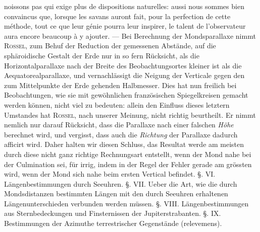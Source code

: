 \noindent noissons pas qui exige plus de dispositions naturelles: aussi nous sommes bien convaincus que, lorsque les savans auront fait, pour la perfection de cette méthode, tout ce que leur génie pourra leur inspirer, le talent de l'observateur aura encore beaucoup à y ajouter. — Bei Berechnung der Mondsparallaxe nimmt \textsc{Rossel}, zum Behuf der Reduction der gemessenen Abstände, auf die sphäroidische Gestalt der Erde nur in so fern Rücksicht, als die Horizontalparallaxe nach der Breite des Beobachtungsortes kleiner ist als die Aequatorealparallaxe, und vernachlässigt die Neigung der Verticale gegen den zum Mittelpunkte der Erde gehenden Halbmesser. Dies hat nun freilich bei Beobachtungen, wie sie mit gewöhnlichen französischen Spiegelkreisen gemacht werden können, nicht viel zu bedeuten: allein den Einfluss dieses letztern Umstandes hat \textsc{Rossel}, nach unserer Meinung, nicht richtig beurtheilt. Er nimmt nemlich nur darauf Rücksicht, dass die Parallaxe nach einer falschen \emph{Höhe} berechnet wird, und vergisst, dass auch die \emph{Richtung} der Parallaxe dadurch afficirt wird. Daher halten wir diesen Schluss, das Resultat werde am meisten durch diese nicht ganz richtige Rechnungsart entstellt, wenn der Mond nahe bei der Culmination sei, für irrig, indem in der Regel der Fehler gerade am grössten wird, wenn der Mond sich nahe beim ersten Vertical befindet. §. VI. Längenbestimmungen durch Seeuhren. §. VII. Ueber die Art, wie die durch Mondsdistanzen bestimmten Längen mit den durch Seeuhren erhaltenen Längenunterschieden verbunden werden müssen. §. VIII. Längenbestimmungen aus Sternbedeckungen und Finsternissen der Jupiterstrabanten. §. IX. Bestimmungen der Azimuthe terrestrischer Gegenstände (relevemens).

